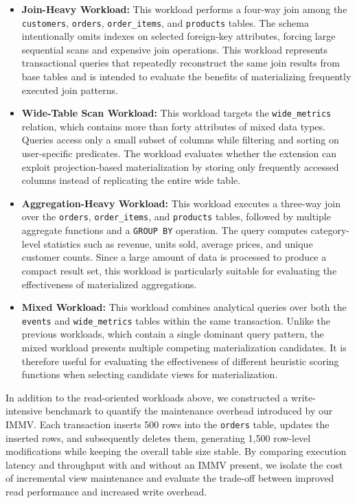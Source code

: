 \begin{itemize}

\item \textbf{Join-Heavy Workload:}
This workload performs a four-way join among the \texttt{customers}, \texttt{orders}, \texttt{order\_items}, and \texttt{products} tables. The schema intentionally omits indexes on selected foreign-key attributes, forcing large sequential scans and expensive join operations. This workload represents transactional queries that repeatedly reconstruct the same join results from base tables and is intended to evaluate the benefits of materializing frequently executed join patterns.

\item \textbf{Wide-Table Scan Workload:}
This workload targets the \texttt{wide\_metrics} relation, which contains more than forty attributes of mixed data types. Queries access only a small subset of columns while filtering and sorting on user-specific predicates. The workload evaluates whether the extension can exploit projection-based materialization by storing only frequently accessed columns instead of replicating the entire wide table.

\item \textbf{Aggregation-Heavy Workload:}
This workload executes a three-way join over the \texttt{orders}, \texttt{order\_items}, and \texttt{products} tables, followed by multiple aggregate functions and a \texttt{GROUP BY} operation. The query computes category-level statistics such as revenue, units sold, average prices, and unique customer counts. Since a large amount of data is processed to produce a compact result set, this workload is particularly suitable for evaluating the effectiveness of materialized aggregations.

\item \textbf{Mixed Workload:}
This workload combines analytical queries over both the \texttt{events} and \texttt{wide\_metrics} tables within the same transaction. Unlike the previous workloads, which contain a single dominant query pattern, the mixed workload presents multiple competing materialization candidates. It is therefore useful for evaluating the effectiveness of different heuristic scoring functions when selecting candidate views for materialization.

\end{itemize}

In addition to the read-oriented workloads above, we constructed a write-intensive benchmark to quantify the maintenance overhead introduced by our IMMV. Each transaction inserts 500 rows into the \texttt{orders} table, updates the inserted rows, and subsequently deletes them, generating 1,500 row-level modifications while keeping the overall table size stable. By comparing execution latency and throughput with and without an IMMV present, we isolate the cost of incremental view maintenance and evaluate the trade-off between improved read performance and increased write overhead.

